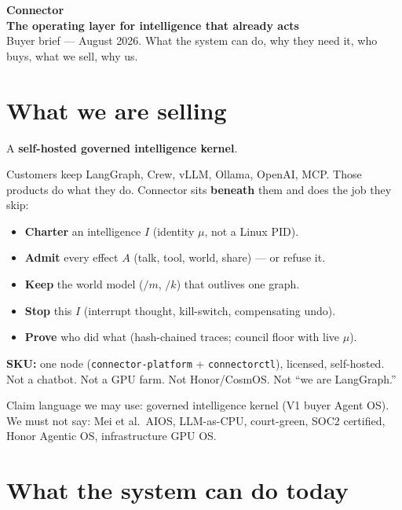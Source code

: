 \documentclass[10pt]{article}
\newcommand{\muted}[1]{\textcolor{textmuted}{#1}}
\begin{document}
\pagestyle{empty}
\thispagestyle{empty}

{\fontsize{16}{19}\selectfont\bfseries\color{navy} Connector}\\[0.12em]
{\fontsize{11}{13}\selectfont\bfseries The operating layer for intelligence that already acts}\\[0.2em]
{\small\muted{Buyer brief --- August 2026. What the system can do, why they need it, who buys, what we sell, why us.}}

\vspace{0.15em}
\noindent{\color{rule}\rule{\linewidth}{0.6pt}}

\section{What we are selling}

A \textbf{self-hosted governed intelligence kernel}.

Customers keep LangGraph, Crew, vLLM, Ollama, OpenAI, MCP. Those products do what they do. Connector sits \textbf{beneath} them and does the job they skip:

\begin{itemize}
  \item \textbf{Charter} an intelligence $I$ (identity $\mu$, not a Linux PID).
  \item \textbf{Admit} every effect $A$ (talk, tool, world, share) --- or refuse it.
  \item \textbf{Keep} the world model ($/m$, $/k$) that outlives one graph.
  \item \textbf{Stop} this $I$ (interrupt thought, kill-switch, compensating undo).
  \item \textbf{Prove} who did what (hash-chained traces; council floor with live $\mu$).
\end{itemize}

\textbf{SKU:} one node (\texttt{connector-platform} + \texttt{connectorctl}), licensed, self-hosted. Not a chatbot. Not a GPU farm. Not Honor/CosmOS. Not ``we are LangGraph.''

{\small\muted{Claim language we may use: governed intelligence kernel (V1 buyer Agent OS). We must not say: Mei et al.\ AIOS, LLM-as-CPU, court-green, SOC2 certified, Honor Agentic OS, infrastructure GPU OS.}}

\section{What the system can do today}
\end{document}
